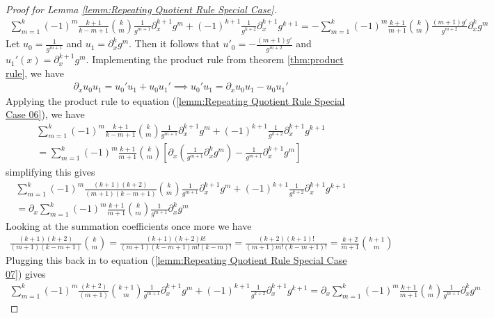 \begin{proof}[Proof for Lemma \ref{lemm:Repeating Quotient Rule Special Case}]
\begin{align}
\sum_{m=1}^{k}(-1)^m\frac{k+1}{k-m+1}\binom{k}{m}\frac{1}{g^{m+1}}\partial_x^{k+1}g^m + (-1)^{k+1}\frac{1}{g^{k+2}}\partial_x^{k+1}g^{k+1} = -\sum_{m=1}^{k}(-1)^m\frac{k+1}{m+1}\binom{k}{m}\frac{(m+1)g'}{g^{m+2}}\partial_x^{k}g^m  \label{lemm:Repeating Quotient Rule Special Case 06}
\end{align}
Let $u_0 = \frac{1}{g^{m+1}}$ and $u_1 = \partial_x^{k}g^m$. Then it follows that $u'_0 = -\frac{(m+1)g'}{g^{m+2}}$ and $u_1'(x) = \partial_x^{k+1}g^m$. Implementing the product rule from theorem \ref{thm:product rule}, we have
\begin{align}
\partial_x u_0u_1 = u_0'u_1 + u_0u_1' \implies
u_0'u_1 = \partial_x u_0u_1 - u_0u_1'
\end{align}
Applying the product rule to equation (\ref{lemm:Repeating Quotient Rule Special Case 06}), we have
\begin{align}
\sum_{m=1}^{k}(-1)^m\frac{k+1}{k-m+1}\binom{k}{m}\frac{1}{g^{m+1}}\partial_x^{k+1}g^m + (-1)^{k+1}\frac{1}{g^{k+2}}\partial_x^{k+1}g^{k+1} \nonumber\\ = \sum_{m=1}^{k}(-1)^m\frac{k+1}{m+1}\binom{k}{m}\left[\partial_x\left(\frac{1}{g^{m+1}}\partial_x^{k}g^m\right) - \frac{1}{g^{m+1}}\partial_x^{k+1}g^m\right]
\end{align}
simplifying this gives
\begin{align}
\sum_{m=1}^{k}(-1)^m\frac{(k+1)(k+2)}{(m+1)(k-m+1)}\binom{k}{m}\frac{1}{g^{m+1}}\partial_x^{k+1}g^m + (-1)^{k+1}\frac{1}{g^{k+2}}\partial_x^{k+1}g^{k+1} \nonumber\\ = \partial_x\sum_{m=1}^{k}(-1)^m\frac{k+1}{m+1}\binom{k}{m}\frac{1}{g^{m+1}}\partial_x^{k}g^m \label{lemm:Repeating Quotient Rule Special Case 07}
\end{align}
Looking at the summation coefficients once more we have
\begin{align}
\frac{(k+1)(k+2)}{(m+1)(k-m+1)}\binom{k}{m} = \frac{(k+1)(k+2)k!}{(m+1)(k-m+1)m!(k-m)!} = \frac{(k+2)(k+1)!}{(m+1)m!(k-m+1)!} = \frac{k+2}{m+1}\binom{k+1}{m}
\end{align}
Plugging this back in to equation (\ref{lemm:Repeating Quotient Rule Special Case 07}) gives
\begin{align}
\sum_{m=1}^{k}(-1)^m\frac{(k+2)}{(m+1)}\binom{k+1}{m}\frac{1}{g^{m+1}}\partial_x^{k+1}g^m + (-1)^{k+1}\frac{1}{g^{k+2}}\partial_x^{k+1}g^{k+1}  = \partial_x\sum_{m=1}^{k}(-1)^m\frac{k+1}{m+1}\binom{k}{m}\frac{1}{g^{m+1}}\partial_x^{k}g^m
\end{align}

\end{proof}
